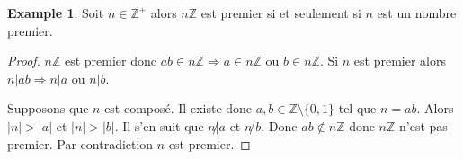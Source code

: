 \documentclass{book}
\theoremstyle{plain}
\theoremstyle{definition}
\newtheorem{ex}[thm]{Example} %
\begin{document}
\begin{ex}
Soit $n\in\mathbb{Z}^+$ alors $n\mathbb{Z}$ est premier si et seulement si $n$ est un nombre premier.
\end{ex}
\begin{proof}
$n\mathbb{Z}$ est premier donc $ab\in n\mathbb{Z}\Longrightarrow a\in n\mathbb{Z}$ ou $b\in n\mathbb{Z}$. Si $n$ est premier alors $n|ab\Longrightarrow n|a$ ou $n|b$.

Supposons que $n$ est composé. Il existe donc $a,b\in\mathbb{Z}\setminus\{0,1\}$ tel que $n=ab$. Alors $|n|>|a|$ et $|n|>|b|$. Il s'en suit que $n\not|a$ et $n\not|b$. Donc $ab\not\in n\mathbb{Z}$ donc $n\mathbb{Z}$ n'est pas premier. Par contradiction $n$ est premier.
\end{proof}
\end{document}

